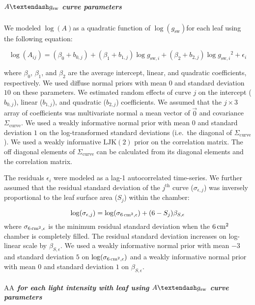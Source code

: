 \documentclass[
  letterpaper,
  DIV=11,
  numbers=noendperiod]{scrartcl}
\let\oldsubparagraph\subparagraph
\renewcommand{\subparagraph}[1]{\oldsubparagraph{#1}\mbox{}}
\newcommand{\aax}{$\mathrm{AA}$}
\newcommand{\agcurve}{$A \textendash g_\text{sw}$}
\newcommand{\loggsw}{$\log(g_\text{sw})$}
\newcommand{\logA}{$\log(A)$}
\begin{document}
\subparagraph{\texorpdfstring{\agcurve{} curve
parameters}{ curve parameters}}\label{curve-parameters}

We modeled \logA as a quadratic function of \loggsw for each leaf using
the following equation:

\[\log(A_{ij}) = (\beta_0 + b_{0,j}) + (\beta_1 + b_{1,j}) \log{g_{\text{sw},i}} + (\beta_2 + b_{2,j}) \log{g_{\text{sw},i}}^2 + \epsilon_{i}\]

where \(\beta_0\), \(\beta_1\), and \(\beta_2\) are the average
intercept, linear, and quadratic coefficients, respectively. We used
diffuse normal priors with mean \(0\) and standard deviation \(10\) on
these parameters. We estimated random effects of curve \(j\) on the
intercept (\(b_{0,j}\)), linear (\(b_{1,j}\)), and quadratic
(\(b_{2,j}\)) coefficients. We assumed that the \(j \times 3\) array of
coefficients was multivariate normal a mean vector of \(\vec{0}\) and
covariance \(\Sigma_\text{curve}\). We used a weakly informative normal
prior with mean \(0\) and standard deviation \(1\) on the
log-transformed standard deviations (i.e.~the diagonal of
\(\Sigma_\text{curve}\)). We used a weakly informative
\(\mathrm{LJK}(2)\) prior on the correlation matrix. The off diagonal
elements of \(\Sigma_\text{curve}\) can be calculated from its diagonal
elements and the correlation matrix.

The residuals \(\epsilon_{i}\) were modeled as a lag-1 autocorrelated
time-series. We further assumed that the residual standard deviation of
the \(j^{\text{th}}\) curve (\(\sigma_{\epsilon,j}\)) was inversely
proportional to the leaf surface area (\(S_j\)) within the chamber:

\[\log (\sigma_{\epsilon,j}) = \log (\sigma_{\qty{6}{\raiseto{2}\centi\meter},\epsilon}) + (6 - S_j) \beta_{S,\epsilon}\]
where \(\sigma_{\qty{6}{\raiseto{2}\centi\meter},\epsilon}\) is the
minimum residual standard deviation when the
\(\qty{6}{\raiseto{2}\centi\meter}\) chamber is completely filled. The
residual standard deviation increases on log-linear scale by
\(\beta_{S,\epsilon}\). We used a weakly informative normal prior with
mean \(-3\) and standard deviation \(5\) on
\(\log (\sigma_{\qty{6}{\raiseto{2}\centi\meter},\epsilon})\) and a
weakly informative normal prior with mean \(0\) and standard deviation
\(1\) on \(\beta_{S,\epsilon}\).

\subparagraph{\texorpdfstring{\aax{} for each light intensity with leaf
using \agcurve{} curve
parameters}{ for each light intensity with leaf using  curve parameters}}\label{for-each-light-intensity-with-leaf-using-curve-parameters}
\end{document}

